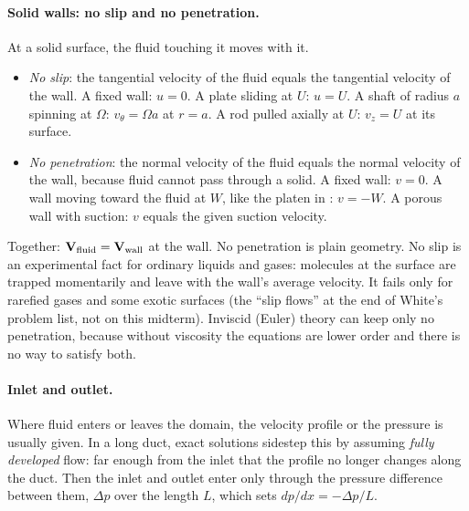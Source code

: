 \paragraph{Solid walls: no slip and no penetration.} At a solid surface, the fluid touching it moves with it.
\begin{itemize}[nosep,leftmargin=*]
\item \emph{No slip}: the tangential velocity of the fluid equals the tangential velocity of the wall. A fixed wall: $u = 0$. A plate sliding at $U$: $u = U$. A shaft of radius $a$ spinning at $\Omega$: $v_\theta = \Omega a$ at $r = a$. A rod pulled axially at $U$: $v_z = U$ at its surface.
\item \emph{No penetration}: the normal velocity of the fluid equals the normal velocity of the wall, because fluid cannot pass through a solid. A fixed wall: $v = 0$. A wall moving toward the fluid at $W$, like the platen in : $v = -W$. A porous wall with suction: $v$ equals the given suction velocity.
\end{itemize}
Together: $\mathbf{V}_{\text{fluid}} = \mathbf{V}_{\text{wall}}$ at the wall. No penetration is plain geometry. No slip is an experimental fact for ordinary liquids and gases: molecules at the surface are trapped momentarily and leave with the wall's average velocity. It fails only for rarefied gases and some exotic surfaces (the ``slip flows'' at the end of White's problem list, not on this midterm). Inviscid (Euler) theory can keep only no penetration, because without viscosity the equations are lower order and there is no way to satisfy both.

\paragraph{Inlet and outlet.} Where fluid enters or leaves the domain, the velocity profile or the pressure is usually given. In a long duct, exact solutions sidestep this by assuming \emph{fully developed} flow: far enough from the inlet that the profile no longer changes along the duct. Then the inlet and outlet enter only through the pressure difference between them, $\Delta p$ over the length $L$, which sets $dp/dx = -\Delta p/L$.

